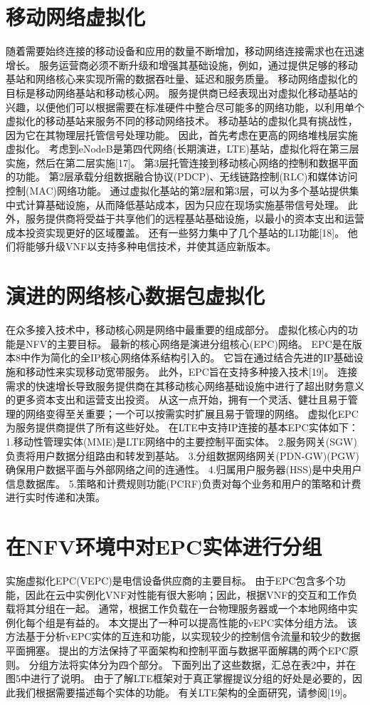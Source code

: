 \chapter{移动网络虚拟化}
随着需要始终连接的移动设备和应用的数量不断增加，移动网络连接需求也在迅速增长。
服务运营商必须不断升级和增强其基础设施，例如，通过提供足够的移动基站和网络核心来实现所需的数据吞吐量、延迟和服务质量。
移动网络虚拟化的目标是移动网络基站和移动核心网。
服务提供商已经表现出对虚拟化移动基站的兴趣，以便他们可以根据需要在标准硬件中整合尽可能多的网络功能，以利用单个虚拟化的移动基站来服务不同的移动网络技术。
移动基站的虚拟化具有挑战性，因为它在其物理层托管信号处理功能。
因此，首先考虑在更高的网络堆栈层实施虚拟化。
考虑到eNodeB是第四代网络(长期演进，LTE)基站，虚拟化将在第三层实施，然后在第二层实施[17]。
第3层托管连接到移动核心网络的控制和数据平面的功能。
第2层承载分组数据融合协议(PDCP)、无线链路控制(RLC)和媒体访问控制(MAC)网络功能。
通过虚拟化基站的第2层和第3层，可以为多个基站提供集中式计算基础设施，从而降低基站成本，因为只应在现场实施基带信号处理。
此外，服务提供商将受益于共享他们的远程基站基础设施，以最小的资本支出和运营成本投资实现更好的区域覆盖。
还有一些努力集中了几个基站的L1功能[18]。
他们将能够升级VNF以支持多种电信技术，并使其适应新版本。


\chapter{演进的网络核心数据包虚拟化}
在众多接入技术中，移动核心网是网络中最重要的组成部分。
虚拟化核心内的功能是NFV的主要目标。
最新的核心网络是演进分组核心(EPC)网络。
EPC是在版本8中作为简化的全IP核心网络体系结构引入的。
它旨在通过结合先进的IP基础设施和移动性来实现移动宽带服务。
此外，EPC旨在支持多种接入技术[19]。
连接需求的快速增长导致服务提供商在其移动核心网络基础设施中进行了超出财务意义的更多资本支出和运营支出投资。
从这一点开始，拥有一个灵活、健壮且易于管理的网络变得至关重要；一个可以按需实时扩展且易于管理的网络。
虚拟化EPC为服务提供商提供了所有这些好处。
在LTE中支持IP连接的基本EPC实体如下：1.移动性管理实体(MME)是LTE网络中的主要控制平面实体。
2.服务网关(SGW)负责将用户数据分组路由和转发到基站。
3.分组数据网络网关(PDN-GW)(PGW)确保用户数据平面与外部网络之间的连通性。
4.归属用户服务器(HSS)是中央用户信息数据库。
5.策略和计费规则功能(PCRF)负责对每个业务和用户的策略和计费进行实时传递和决策。


\chapter{在NFV环境中对EPC实体进行分组}
实施虚拟化EPC(VEPC)是电信设备供应商的主要目标。
由于EPC包含多个功能，因此在云中实例化VNF对性能有很大影响；因此，根据VNF的交互和工作负载将其分组在一起。
通常，根据工作负载在一台物理服务器或一个本地网络中实例化每个组是有益的。
本文提出了一种可以提高性能的vEPC实体分组方法。
该方法基于分析vEPC实体的互连和功能，以实现较少的控制信令流量和较少的数据平面拥塞。
提出的方法保持了平面架构和控制平面与数据平面解耦的两个EPC原则。
分组方法将实体分为四个部分。
下面列出了这些数据，汇总在表2中，并在图5中进行了说明。
由于了解LTE框架对于真正掌握提议分组的好处是必要的，因此我们根据需要描述每个实体的功能。
有关LTE架构的全面研究，请参阅[19]。

